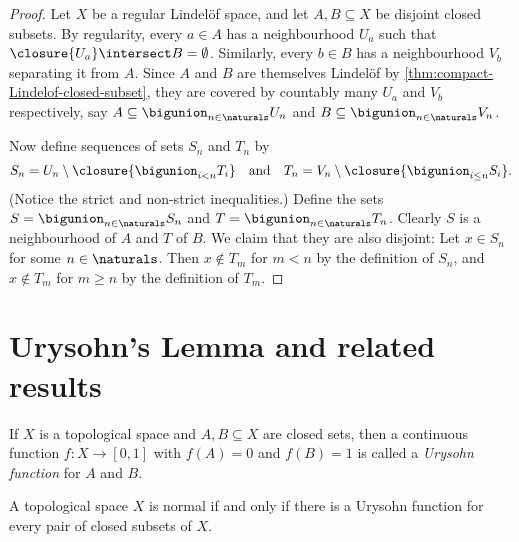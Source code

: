 \documentclass[article, a4paper, 11pt, oneside]{memoir}
\numberwithin{equation}{chapter}
\begin{document}
\begin{proof}
    Let $X$ be a regular Lindelöf space, and let $A,B \subseteq X$ be disjoint closed subsets. By regularity, every $a \in A$ has a neighbourhood $U_a$ such that $\closure{U_a} \intersect B = \emptyset$. Similarly, every $b \in B$ has a neighbourhood $V_b$ separating it from $A$. Since $A$ and $B$ are themselves Lindelöf by \cref{thm:compact-Lindelof-closed-subset}, they are covered by countably many $U_a$ and $V_b$ respectively, say $A \subseteq \bigunion_{n \in \naturals} U_n$ and $B \subseteq \bigunion_{n \in \naturals} V_n$.

    Now define sequences of sets $S_n$ and $T_n$ by
    \begin{equation*}
        S_n = U_n \setminus \closure{ \bigunion_{i < n} T_i}
        \quad \text{and} \quad
        T_n = V_n \setminus \closure{ \bigunion_{i \leq n} S_i}.
    \end{equation*}
    (Notice the strict and non-strict inequalities.) Define the sets $S = \bigunion_{n \in \naturals} S_n$ and $T = \bigunion_{n \in \naturals} T_n$. Clearly $S$ is a neighbourhood of $A$ and $T$ of $B$. We claim that they are also disjoint: Let $x \in S_n$ for some $n \in \naturals$. Then $x \not\in T_m$ for $m < n$ by the definition of $S_n$, and $x \not\in T_m$ for $m \geq n$ by the definition of $T_m$. 
\end{proof}


\section{Urysohn's Lemma and related results}

If $X$ is a topological space and $A,B \subseteq X$ are closed sets, then a continuous function $f \colon X \to [0,1]$ with $f(A) = 0$ and $f(B) = 1$ is called a \emph{Urysohn function} for $A$ and $B$.

\begin{theorem}
    A topological space $X$ is normal if and only if there is a Urysohn function for every pair of closed subsets of $X$.
\end{theorem}
\end{document}
